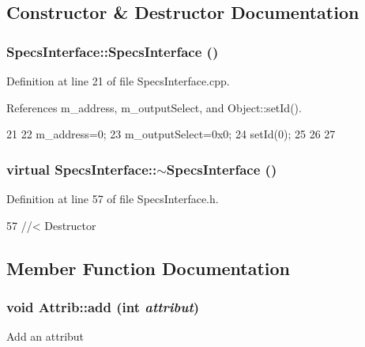 \subsection{Constructor \& Destructor Documentation}
\hypertarget{classSpecsInterface_a33b267de6a6447965f068adea3aba138}{
\subsubsection[{SpecsInterface}]{\setlength{\rightskip}{0pt plus 5cm}SpecsInterface::SpecsInterface ()}}
\label{classSpecsInterface_a33b267de6a6447965f068adea3aba138}


Definition at line 21 of file SpecsInterface.cpp.

References m\_\-address, m\_\-outputSelect, and Object::setId().


\begin{DoxyCode}
21                               {
22   m_address=0;
23   m_outputSelect=0x0;
24   setId(0);
25 
26 
27 }
\end{DoxyCode}
\hypertarget{classSpecsInterface_a914c632c299fa854be1ff9387b4d8939}{
\subsubsection[{$\sim$SpecsInterface}]{\setlength{\rightskip}{0pt plus 5cm}virtual SpecsInterface::$\sim$SpecsInterface ()}}
\label{classSpecsInterface_a914c632c299fa854be1ff9387b4d8939}


Definition at line 57 of file SpecsInterface.h.


\begin{DoxyCode}
57 {} //< Destructor
\end{DoxyCode}


\subsection{Member Function Documentation}
\hypertarget{classAttrib_a235f773af19c900264a190b00a3b4ad7}{
\subsubsection[{add}]{\setlength{\rightskip}{0pt plus 5cm}void Attrib::add (int {\em attribut})}}
\label{classAttrib_a235f773af19c900264a190b00a3b4ad7}
Add an attribut 

